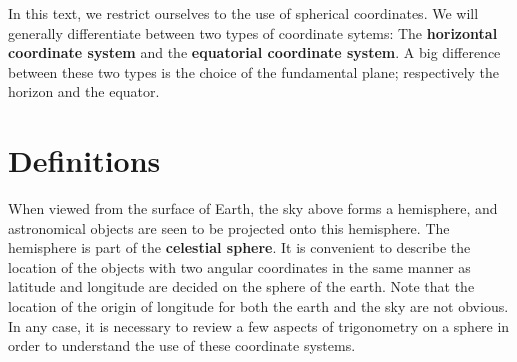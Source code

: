 In this text, we restrict ourselves to the use of spherical coordinates. We will generally
differentiate between two types of coordinate sytems: The \textbf{horizontal coordinate system} and
the \textbf{equatorial coordinate system}. A big difference between these two types
is the choice of the fundamental plane; respectively the horizon and the equator.

\section{Definitions}
When viewed from the surface of Earth, the sky above forms a hemisphere, and 
astronomical objects are seen to be projected onto this hemisphere. The hemisphere is part
of the \textbf{celestial sphere}.
It is convenient to describe the location of the objects with two angular coordinates in the
same manner as latitude and longitude are decided on the sphere of the earth. 
Note that the location of the origin of longitude for both the earth and the 
sky are not obvious. In any case, it is necessary to review a few aspects of 
trigonometry on a sphere in order to understand the use of these coordinate 
systems.

